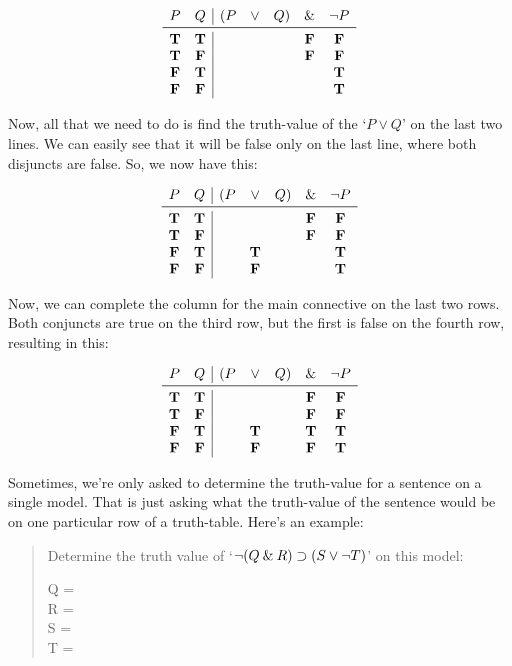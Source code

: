 \documentclass[../logic-text.tex]{subfiles}
\begin{document}
\[
  \begin{array}{cc|ccccc}
    P & Q & (P & \lor & Q) & \land & \lneg P \\ \midrule
    \true & \true &&&& \false & \false \\
    \true & \false &&&& \false & \false \\
    \false & \true &&&&& \true \\
    \false &\false &&&&& \true \\
\end{array}
\]

Now, all that we need to do is find the truth-value of the \enquote*{\(P \lor Q\)} on the last two lines.
We can easily see that it will be false only on the last line, where both disjuncts are false.
So, we now have this:

\[
  \begin{array}{cc|ccccc}
    P & Q & (P & \lor & Q) & \land & \lneg P \\ \midrule
    \true & \true &&&& \false & \false \\
    \true & \false &&&& \false & \false \\
    \false & \true && \true &&& \true \\
    \false &\false && \false &&& \true \\
\end{array}
\]

Now, we can complete the column for the main connective on the last two rows.
Both conjuncts are true on the third row, but the first is false on the fourth row, resulting in this:


\[
  \begin{array}{cc|ccccc}
    P & Q & (P & \lor & Q) & \land & \lneg P \\ \midrule
    \true & \true &&&& \false & \false \\
    \true & \false &&&& \false & \false \\
    \false & \true && \true && \true & \true \\
    \false &\false && \false && \false & \true \\
\end{array}
\]


Sometimes, we're only asked to determine the truth-value for a sentence on a single model.
That is just asking what the truth-value of the sentence would be on one particular row of a truth-table.
Here's an example:

\begin{quote}
  Determine the truth value of \enquote*{\(\neg (Q \mathbin{\&} R) \supset (S \lor \neg T)\)} on this model:

  Q = \false\\
  R = \true\\
  S = \false\\
  T = \false
\end{quote}
\end{document}
